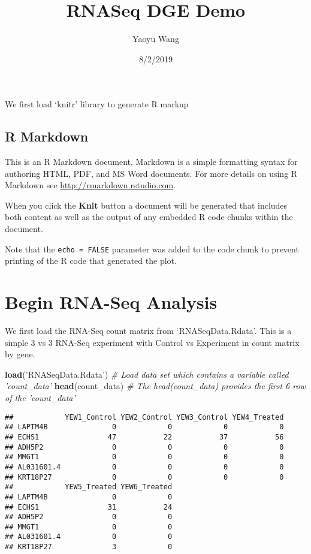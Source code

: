 \documentclass[]{article}
\title{RNASeq DGE Demo}
\author{Yaoyu Wang}
\date{8/2/2019}
\newenvironment{Shaded}{\begin{snugshade}}{\end{snugshade}}
\newcommand{\KeywordTok}[1]{\textcolor[rgb]{0.13,0.29,0.53}{\textbf{#1}}}
\newcommand{\StringTok}[1]{\textcolor[rgb]{0.31,0.60,0.02}{#1}}
\newcommand{\CommentTok}[1]{\textcolor[rgb]{0.56,0.35,0.01}{\textit{#1}}}
\newcommand{\NormalTok}[1]{#1}
\begin{document}
\maketitle

We first load `knitr' library to generate R markup

\subsection{R Markdown}\label{r-markdown}

This is an R Markdown document. Markdown is a simple formatting syntax
for authoring HTML, PDF, and MS Word documents. For more details on
using R Markdown see \url{http://rmarkdown.rstudio.com}.

When you click the \textbf{Knit} button a document will be generated
that includes both content as well as the output of any embedded R code
chunks within the document.

Note that the \texttt{echo\ =\ FALSE} parameter was added to the code
chunk to prevent printing of the R code that generated the plot.

\section{Begin RNA-Seq Analysis}\label{begin-rna-seq-analysis}

We first load the RNA-Seq count matrix from `RNASeqData.Rdata'. This is
a simple 3 vs 3 RNA-Seq experiment with Control vs Experiment in count
matrix by gene.

\begin{Shaded}
\begin{Highlighting}[]
\KeywordTok{load}\NormalTok{(}\StringTok{'RNASeqData.Rdata'}\NormalTok{)   }\CommentTok{# Load data set which contains a variable called 'count_data'}
\KeywordTok{head}\NormalTok{(count_data)           }\CommentTok{# The head(count_data) provides the first 6 row of the 'count_data'}
\end{Highlighting}
\end{Shaded}

\begin{verbatim}
##            YEW1_Control YEW2_Control YEW3_Control YEW4_Treated
## LAPTM4B               0            0            0            0
## ECHS1                47           22           37           56
## ADH5P2                0            0            0            0
## MMGT1                 0            0            0            0
## AL031601.4            0            0            0            0
## KRT18P27              0            0            0            0
##            YEW5_Treated YEW6_Treated
## LAPTM4B               0            0
## ECHS1                31           24
## ADH5P2                0            0
## MMGT1                 0            0
## AL031601.4            0            0
## KRT18P27              3            0
\end{verbatim}
\end{document}
